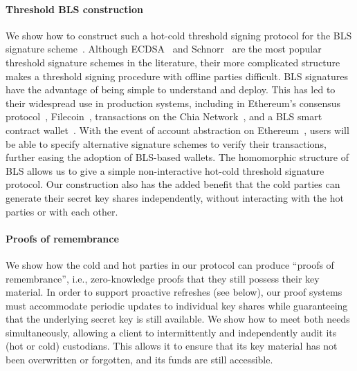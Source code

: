 \paragraph{Threshold BLS construction}
We show how to construct such a hot-cold threshold signing protocol for the BLS signature scheme~\cite{AC:BonLynSha01,PKC:Boldyreva03}. Although ECDSA~\cite{EPRINT:GenGolNar16,SP:DKLs18,CCS:LinNof18,CCS:GenGol18,EPRINT:AumHamShl20,EPRINT:GKSS20,EPRINT:DJNPO20,CCS:CGGMP20,PKC:CCLST20,EPRINT:CCLST21,CANS:Pettit21,SP:ANOSS22} and Schnorr~\cite{SAC:KomGol20,C:BCKMTZ22,EPRINT:BatLonMen22} are the most popular threshold signature schemes in the literature, their more complicated structure makes a threshold signing procedure with offline parties difficult. 
BLS signatures have the advantage of being simple to understand and deploy. This has led to their widespread use in production systems, including in Ethereum's consensus protocol~\cite[\S2.9.1]{eth2book}, Filecoin~\cite{Filecoin-Spec}, transactions on the Chia Network~\cite{chia-bls}, and a BLS smart contract wallet~\cite{bls-wallet}.
With the event of account abstraction on Ethereum~\cite{account-abstraction}, users will be able to specify alternative signature schemes to verify their transactions, further easing the adoption of BLS-based wallets. 
The homomorphic structure of BLS allows us to give a simple non-interactive hot-cold threshold signature protocol. 
Our construction also has the added benefit that the cold parties can generate their secret key shares independently, without interacting with the hot parties or with each other. 

\paragraph{Proofs of remembrance}
We show how the cold and hot parties in our protocol can produce ``proofs of remembrance'', i.e., zero-knowledge proofs that they still possess their key material. In order to support proactive refreshes (see below), our proof systems must accommodate periodic updates to individual key shares while guaranteeing that the underlying secret key is still available. We show how to meet both needs simultaneously, allowing a client to intermittently and independently audit its (hot or cold) custodians. This allows it to ensure that its key material has not been overwritten or forgotten, and its funds are still accessible.

